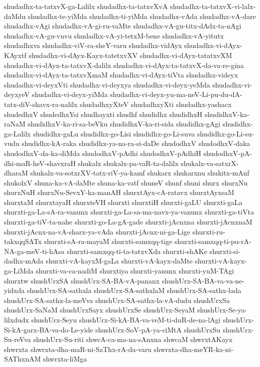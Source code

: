 {shudadhx-ta-tatxvX-ga-Lalilx
shudadhx-ta-tatxvXvA
shudadhx-ta-tatxvX-vi-lalx-daMdu
shudadhx-te-yiMda
shudadhx-ti-yiMda
shudadhx-vAda
shudadhx-vA-dare
shudadhx-vAgi
shudadhx-vA-gi-ru-vaMte
shudadhx-vA-gu-titx-dAdx-ta-nAgi
shudadhx-vA-gu-vuvu
shudadhx-vA-yi-tetxM-bene
shudadhx-vA-yitutx
shudadhxva
shudadhx-viV-ra-sheY-varu
shudadhx-vidAyx
shudadhx-vi-dAyx-KAyxtf
shudadhx-vi-dAyx-Kayx-tatetxvXV
shudadhx-vi-dAyx-tatatxvXM
shudadhx-vi-dAyx-ta-tatxvX-dalilx
shudadhx-vi-dAyx-ta-tatxvX-da-va-re-gina
shudadhx-vi-dAyx-ta-tatxvXmaM
shudadhx-vi-dAyx-tiVta
shudadhx-videyx
shudadhx-vi-deyxVti
shudadhx-vi-deyxya
shudadhx-vi-deyx-yeMda
shudadhx-vi-deyxyeV
shudadhx-vi-deyx-yiMda
shudadhx-vi-deyx-yu-ma-neV-Li-pu-du-dA-tatx-diV-shavx-ra-nalilx
shudadhxyXteV
shudadhxyXti
shudadhx-yashacx
shudedhxV
shudedhxYsi
shudhayxti
shudhf
shudidhx
shudidhxH
shudidhxV-ka-raNaM
shudidhxV-ka-ri-sa-beVku
shudidhxV-ka-ri-sida
shudidhx-gAgi
shudidhx-ga-Lalilx
shudidhx-gaLu
shudidhx-go-Lisi
shudidhx-go-Li-suva
shudidhx-go-Li-su-vudu
shudidhx-kA-raka
shudidhx-ya-na-ra-si-daDe
shudodhxV
shudodhxV-daka
shudodhxV-da-ka-diMda
shudodhxV-pAdhi
shudodhxV-pAdhiH
shudodhxV-pA-dhi-maR-heV-shavxraH
shukalx
shukalx-pa-vaR-ta-dalilx
shukalx-va-satxrX-dharaM
shukalx-va-sotxrXV-tatx-riV-ya-kamf
shukarx
shukarxnu
shukitx-mAnf
shukolxV
shuna-ka-vA-daMte
shuna-ka-vatf
shuneV
shunf
shuni
shurx
shurxNu
shurxNuH
shurxNu-SevxY-ka-manAH
shurxtAyx-cA-ratavx
shurxtAyxsaM
shurxtaM
shurxtayaH
shurxteVH
shurxti
shurxtiH
shurxti-gaLU
shurxti-gaLa
shurxti-ga-La-sA-ra-vanunx
shurxti-ga-La-sa-ma-navx-ya-vanunx
shurxti-ga-tiVta
shurxti-ga-tiV-ta-nahe
shurxti-go-La-gA-gade
shurxti-jAcnxna
shurxti-jAcnxnaM
shurxti-jAcnx-na-vA-sharx-ya-vAda
shurxti-jAcnx-ni-ga-Lige
shurxti-ru-takxqqSATx
shurxti-sA-ra-mayaM
shurxti-samxqq-tige
shurxti-samxqq-ti-pu-rA-NA-ga-meV-ti-hAsa
shurxti-samxqq-ti-ta-tatxvXda
shurxti-shAKe
shurxti-si-dadhx-mAda
shurxti-vA-kayxM-gaLa
shurxti-vA-kayx-daMte
shurxti-vA-kayx-ga-LiMda
shurxti-va-ca-nadiM
shurxtiya
shurxti-yanunx
shurxti-yuM-TAgi
shurxtw
shushUrxSA
shushUrx-SA-BA-vA-pananx
shushUrx-SA-BA-va-va-ne-yidxda
shushUrx-SA-sathxla
shushUrx-SA-sathxlaM
shushUrx-SA-sathx-lada
shushUrx-SA-sathx-la-meVva
shushUrx-SA-sathx-la-vA-dudu
shushUrxSa
shushUrx-SaNaM
shushUrxSayx
shushUrxSe
shushUrx-SeyaM
shushUrx-Se-ya-lilxdudx
shushUrx-Seyu
shushUrx-Si-kA-BA-va-veM-ti-duR-de-na-lAgi
shushUrx-Si-kA-garx-BA-va-do-Le-yide
shushUrx-SoV-pA-ya-ciMtA
shushUrxSu
shushUrx-Su-reVva
shushUrx-Su-riti
shwcA-ca-ma-na-sAnxna
shwcaM
shwrxtAKayx
shwrxta
shwrxta-dha-maR-ni-SaThx-rA-da-varu
shwrxta-dha-meYR-ka-ni-SAThxnAM
shwrxta-liMga
}
